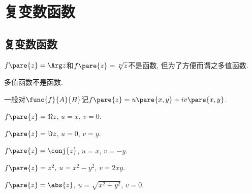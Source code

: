 \documentclass{ctexart}
\begin{document}
\section{复变数函数} %
\label{sec:复变数函数}

\headerstamp

\subsection{复变数函数} %
\label{sub:复变数函数}

\begin{ex}
    $f\pare{z} = \Arg z$和$f\pare{z} = \sqrt[n]{z}$不是函数, 但为了方便而谓之多值函数.
\end{ex}
\begin{pitfall}
    多值函数不是函数.
\end{pitfall}
一般对$\func{f}{A}{B}$记$f\pare{z} = u\pare{x,y} + iv\pare{x,y}$.
\begin{sample}
    \begin{ex}
        $f\pare{z} = \Re z$, $u=x$, $v=0$.
    \end{ex}
    \begin{ex}
        $f\pare{z} = \Im z$, $u=0$, $v=y$.
    \end{ex}
    \begin{ex}
        $f\pare{z} = \conj{z}$, $u=x$, $v=-y$.
    \end{ex}
    \begin{ex}
        $f\pare{z} = z^2,$ $u = x^2-y^2$, $v=2xy$.
    \end{ex}
    \begin{ex}
        $f\pare{z} = \abs{z}$, $u = \sqrt{x^2+y^2}$, $v = 0$.
    \end{ex}
\end{sample}
\end{document}
